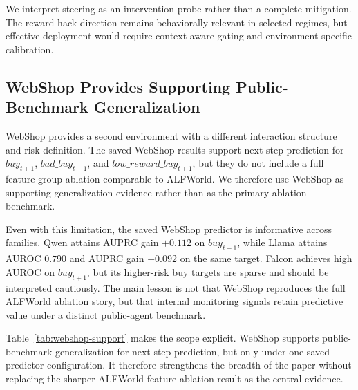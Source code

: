 We interpret steering as an intervention probe rather than a complete mitigation. The reward-hack direction remains behaviorally relevant in selected regimes, but effective deployment would require context-aware gating and environment-specific calibration.

\subsection{WebShop Provides Supporting Public-Benchmark Generalization}
\label{sec:webshop-support}

WebShop provides a second environment with a different interaction structure and risk definition. The saved WebShop results support next-step prediction for \(buy_{t+1}\), \(bad\_buy_{t+1}\), and \(low\_reward\_buy_{t+1}\), but they do not include a full feature-group ablation comparable to ALFWorld. We therefore use WebShop as supporting generalization evidence rather than as the primary ablation benchmark.

Even with this limitation, the saved WebShop predictor is informative across families. Qwen attains AUPRC gain \(+0.112\) on \(buy_{t+1}\), while Llama attains AUROC \(0.790\) and AUPRC gain \(+0.092\) on the same target. Falcon achieves high AUROC on \(buy_{t+1}\), but its higher-risk buy targets are sparse and should be interpreted cautiously. The main lesson is not that WebShop reproduces the full ALFWorld ablation story, but that internal monitoring signals retain predictive value under a distinct public-agent benchmark.

\begin{table}[t]
\centering
\caption{Saved WebShop next-step prediction results. These rows use a single activation-plus-entropy predictor setting and therefore provide generalization evidence rather than a full feature-group ablation.}
\label{tab:webshop-support}
\end{table}

Table~\ref{tab:webshop-support} makes the scope explicit. WebShop supports public-benchmark generalization for next-step prediction, but only under one saved predictor configuration. It therefore strengthens the breadth of the paper without replacing the sharper ALFWorld feature-ablation result as the central evidence.
